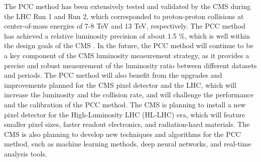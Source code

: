The PCC method has been extensively tested and validated by the CMS during the LHC Run 1 and Run 2, which corresponded to proton-proton collisions at center-of-mass energies of 7-8 TeV and 13 TeV, respectively. The PCC method has achieved a relative luminosity precision of about 1.5 \%, which is well within the design goals of the CMS \cite{pas_18}. In the future, the PCC method will continue to be a key component of the CMS luminosity measurement strategy, as it provides a precise and robust measurement of the luminosity ratio between different datasets and periods. The PCC method will also benefit from the upgrades and improvements planned for the CMS pixel detector and the LHC, which will increase the luminosity and the collision rate, and will challenge the performance and the calibration of the PCC method. The CMS is planning to install a new pixel detector for the High-Luminosity LHC (HL-LHC) era, which will feature smaller pixel sizes, faster readout electronics, and radiation-hard materials. The CMS is also planning to develop new techniques and algorithms for the PCC method, such as machine learning methods, deep neural networks, and real-time analysis tools.




